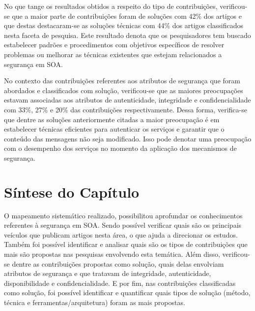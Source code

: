 No que tange os resultados obtidos a respeito do tipo de contribuições, verificou-se que a maior parte de contribuições foram de soluções com 42\% dos artigos e que destas destacaram-se as soluções técnicas com 44\% dos artigos classificados nesta faceta de pesquisa. Este resultado denota que os pesquisadores tem buscado estabelecer padrões e procedimentos  com objetivos específicos de resolver problemas ou melhorar as técnicas existentes que estejam  relacionados a segurança em SOA.

No contexto das contribuições referentes aos atributos de segurança que foram abordados e classificados com solução, verificou-se que as maiores preocupações estavam associadas aos atributos de  autenticidade, integridade e confidencialidade com 33\%, 27\% e 20\% das contribuições respectivamente. Dessa forma, verifica-se que dentre as soluções anteriormente citadas a maior preocupação é em estabelecer técnicas eficientes para autenticar os serviços e garantir que o conteúdo das mensagens não seja modificado. Isso pode denotar uma preocupação com o desempenho dos serviços no momento da aplicação dos mecanismos de segurança.
%


\section{Síntese do Capítulo}

O mapeamento sistemático realizado, possibilitou aprofundar os conhecimentos referentes à segurança em SOA. Sendo possível verificar quais são os principais veículos que publicam artigos nesta área, o que ajuda a direcionar os estudos. Também foi possível identificar e analisar quais são os tipos de contribuições que mais são propostas nas pesquisas envolvendo esta temática. Além disso, verificou-se dentre as contribuições propostas como solução, quais delas envolviam atributos de segurança e que tratavam de integridade, autenticidade, disponibilidade e confidencialidade. E por fim, nas contribuições classificadas como solução, foi possível identificar e quantificar quais tipos de solução (método, técnica e ferramentas/arquitetura) foram as mais propostas.

